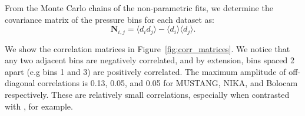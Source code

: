 \documentclass[twocolumn,traditabstract]{aa}
\begin{document}

From the Monte Carlo chains of the non-parametric fits, we determine the covariance matrix of the pressure bins for each dataset as:
\begin{equation}
  \mathbf{N}_{i,j} = \langle d_i d_j \rangle - \langle d_i \rangle \langle d_j \rangle.
  \label{eqn:covariance}
\end{equation}

We show the correlation matrices in Figure~\ref{fig:corr_matrices}. We notice
that any two adjacent bins are negatively correlated, and by extension, bins spaced 2 apart (e.g bins 1 and 3) are positively
correlated. The maximum amplitude of off-diagonal correlations is 0.13, 0.05, and 0.05 for MUSTANG, NIKA, and Bolocam respectively.
These are relatively small correlations, especially when contrasted with \citet{sayers2013}, for example.
\end{document}
